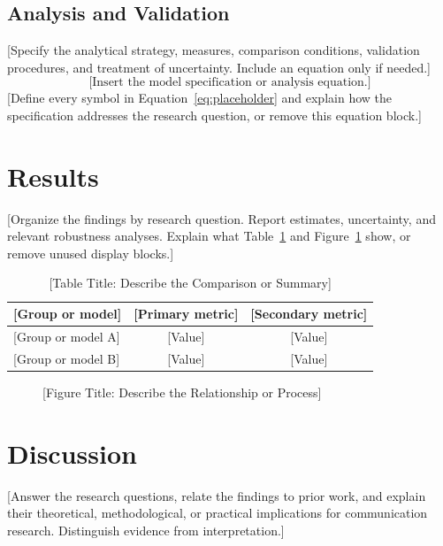 \documentclass[12pt,letterpaper,oneside]{article}
\begin{document}
\subsection{Analysis and Validation}
[Specify the analytical strategy, measures, comparison conditions, validation
procedures, and treatment of uncertainty. Include an equation only if needed.]
\begin{equation}
  \text{[Insert the model specification or analysis equation.]}
  \label{eq:placeholder}
\end{equation}
[Define every symbol in Equation~\ref{eq:placeholder} and explain how the
specification addresses the research question, or remove this equation block.]

\section{Results}
[Organize the findings by research question. Report estimates, uncertainty,
and relevant robustness analyses. Explain what Table~\ref{tab:placeholder}
and Figure~\ref{fig:placeholder} show, or remove unused display blocks.]

\begin{table}[htbp]
  \caption{[Table Title: Describe the Comparison or Summary]}
  \label{tab:placeholder}
  \centering
  \begin{tabular}{lcc}
    \toprule
    {[Group or model]} & {[Primary metric]} & {[Secondary metric]} \\
    \midrule
    {[Group or model A]} & {[Value]} & {[Value]} \\
    {[Group or model B]} & {[Value]} & {[Value]} \\
    \bottomrule
  \end{tabular}
\end{table}

\begin{figure}[htbp]
  \centering
  \caption{[Figure Title: Describe the Relationship or Process]}
  \label{fig:placeholder}
\end{figure}

\section{Discussion}
[Answer the research questions, relate the findings to prior work, and explain
their theoretical, methodological, or practical implications for communication
research. Distinguish evidence from interpretation.]
\end{document}
